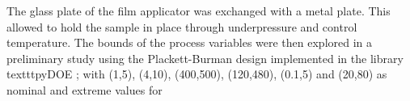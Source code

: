 %
The glass plate of the film applicator was exchanged with a metal plate.
This allowed to hold the sample in place through underpressure and control temperature. 
The bounds of the process variables were then explored in a preliminary study 
using the Plackett-Burman\cite{Plackett1946} design implemented in the 
library texttt{pyDOE} ; 
with 
(1,5), (4,10), (400,500), (120,480), (0.1,5) and  (20,80) 
as nominal and extreme values for 
